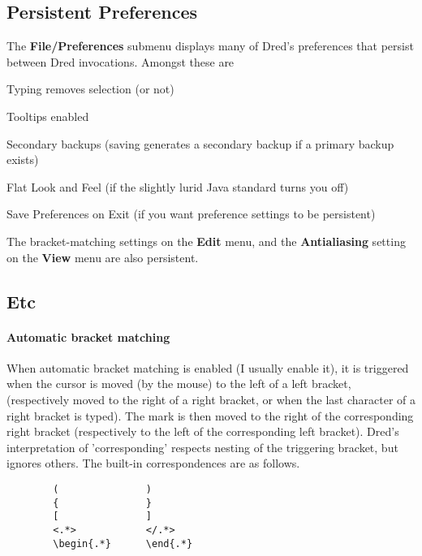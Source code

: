 \documentclass[
]{article}
\begin{document}
\hypertarget{persistent-preferences}{%
\subsection{Persistent Preferences}\label{persistent-preferences}}

The \textbf{File/Preferences} submenu displays many of Dred's
preferences that persist between Dred invocations. Amongst these are

Typing removes selection (or not)

Tooltips enabled

Secondary backups (saving generates a secondary backup if a primary
backup exists)

Flat Look and Feel (if the slightly lurid Java standard turns you off)

Save Preferences on Exit (if you want preference settings to be
persistent)

The bracket-matching settings on the \textbf{Edit} menu, and the
\textbf{Antialiasing} setting on the \textbf{View} menu are also
persistent.

\protect\hypertarget{Etc}{}{}

\hypertarget{etc}{%
\subsection{Etc}\label{etc}}

\hypertarget{automatic-bracket-matching}{%
\paragraph{Automatic bracket
matching}\label{automatic-bracket-matching}}

When automatic bracket matching is enabled (I usually enable it), it is
triggered when the cursor is moved (by the mouse) to the left of a left
bracket, (respectively moved to the right of a right bracket, or when
the last character of a right bracket is typed). The mark is then moved
to the right of the corresponding right bracket (respectively to the
left of the corresponding left bracket). Dred's interpretation of
'corresponding' respects nesting of the triggering bracket, but ignores
others. The built-in correspondences are as follows.

\begin{verbatim}
        (               )
        {               }
        [               ]
        <.*>            </.*>
        \begin{.*}      \end{.*}
\end{verbatim}
\end{document}
